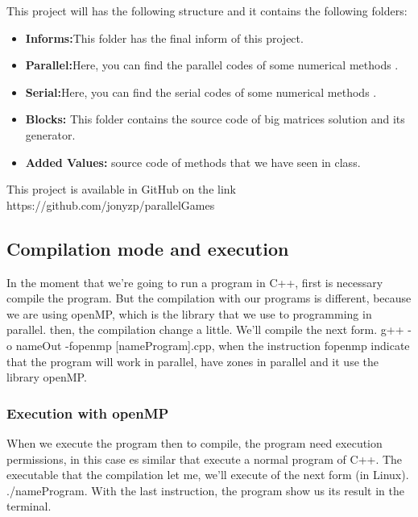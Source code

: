 \documentclass{article}
\begin{document}
This project will has the following structure and it contains the following folders:

\begin{itemize}

\item \textbf{Informs:}This folder has the final inform of this project.

\item \textbf{Parallel:}Here, you can find the parallel codes of some numerical methods .

\item \textbf{Serial:}Here, you can find the serial codes of some numerical methods .

\item \textbf{Blocks:} This folder contains the source code of big matrices solution and its generator.

\item \textbf{Added Values:} source code of methods that we have seen in class.


\end{itemize}
 
This project is available in GitHub on the link https://github.com/jonyzp/parallelGames

\subsection{Compilation mode and execution}
In the moment that we’re going to run a program in C++, first is necessary compile the program. But the compilation with our programs is different, because we are using openMP,  which is the library that we use to programming in parallel. then, the compilation change a little.
We’ll compile the next form. g++ -o nameOut -fopenmp [nameProgram].cpp, when the instruction fopenmp indicate that the program will work in parallel, have zones in parallel and it use the library openMP.\\

\subsubsection{Execution with openMP}
When we execute the program then to compile, the program need execution permissions, in this case es similar that execute a normal program of C++. The executable that the compilation let me, we’ll execute of the next form (in Linux). ./nameProgram. 
With the last instruction, the program show us its result in the terminal.\\
\end{document}

